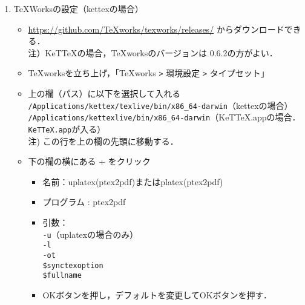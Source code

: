 \documentclass{ujarticle}
\begin{document}
\begin{enumerate}[\bf\large 1.]
\item TeXWorksの設定（kettexの場合）
  \begin{itemize}
  \item \url{https://github.com/TeXworks/texworks/releases/} からダウンロードできる．\\
\hspace*{10mm}注）KeTTeXの場合，TeXworksのバージョンは 0.6.2の方がよい．
  \item TeXworksを立ち上げ，「TeXworks \verb|>| 環境設定 \verb|>| タイプセット」
  \item 上の欄（パス）に以下を選択して入れる\\
  \hspace*{5mm}\verb|/Applications/kettex/texlive/bin/x86_64-darwin|（kettexの場合）\\
  \hspace*{5mm}\verb|/Applications/kettexlive/bin/x86_64-darwin|（KeTTeX.appの場合．\verb|KeTTeX.app|が入る）\\
  \hspace*{10mm}注) この行を上の欄の先頭に移動する．
  \item 下の欄の横にある + をクリック
    \begin{itemize}
    \item 名前：uplatex(ptex2pdf)またはplatex(ptex2pdf)
    \item プログラム : ptex2pdf
    \item 引数：\\
    \hspace*{10mm} \verb|-u|（uplatexの場合のみ）\\
    \hspace*{10mm} \verb|-l|\\
    \hspace*{10mm} \verb|-ot|\\
    \hspace*{10mm}  \verb|$synctexoption|\\
    \hspace*{10mm}  \verb|$fullname|
    \item[]OKボタンを押し，デフォルトを変更してOKボタンを押す．
    \end{itemize}
  \end{itemize}


\end{enumerate}
\end{document}
